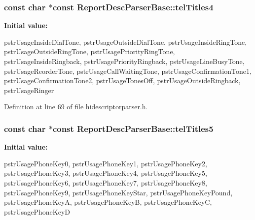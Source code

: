 \hypertarget{class_report_desc_parser_base_a9d51bfc5c2e04a8eaf25561d6d97ae00}{
\subsubsection[{tel\-Titles4}]{\setlength{\rightskip}{0pt plus 5cm}const char $\ast$const {\bf \-Report\-Desc\-Parser\-Base\-::tel\-Titles4}}}\label{class_report_desc_parser_base_a9d51bfc5c2e04a8eaf25561d6d97ae00}
{\bfseries \-Initial value\-:}
\begin{DoxyCode}
 {
        pstrUsageInsideDialTone,
        pstrUsageOutsideDialTone,
        pstrUsageInsideRingTone,
        pstrUsageOutsideRingTone,
        pstrUsagePriorityRingTone,
        pstrUsageInsideRingback,
        pstrUsagePriorityRingback,
        pstrUsageLineBusyTone,
        pstrUsageReorderTone,
        pstrUsageCallWaitingTone,
        pstrUsageConfirmationTone1,
        pstrUsageConfirmationTone2,
        pstrUsageTonesOff,
        pstrUsageOutsideRingback,
        pstrUsageRinger
}
\end{DoxyCode}


\-Definition at line 69 of file hidescriptorparser.\-h.

\hypertarget{class_report_desc_parser_base_a3882e20433145daa93bd23d4cff779e9}{
\subsubsection[{tel\-Titles5}]{\setlength{\rightskip}{0pt plus 5cm}const char $\ast$const {\bf \-Report\-Desc\-Parser\-Base\-::tel\-Titles5}}}\label{class_report_desc_parser_base_a3882e20433145daa93bd23d4cff779e9}
{\bfseries \-Initial value\-:}
\begin{DoxyCode}
 {
        pstrUsagePhoneKey0,
        pstrUsagePhoneKey1,
        pstrUsagePhoneKey2,
        pstrUsagePhoneKey3,
        pstrUsagePhoneKey4,
        pstrUsagePhoneKey5,
        pstrUsagePhoneKey6,
        pstrUsagePhoneKey7,
        pstrUsagePhoneKey8,
        pstrUsagePhoneKey9,
        pstrUsagePhoneKeyStar,
        pstrUsagePhoneKeyPound,
        pstrUsagePhoneKeyA,
        pstrUsagePhoneKeyB,
        pstrUsagePhoneKeyC,
        pstrUsagePhoneKeyD
}
\end{DoxyCode}


